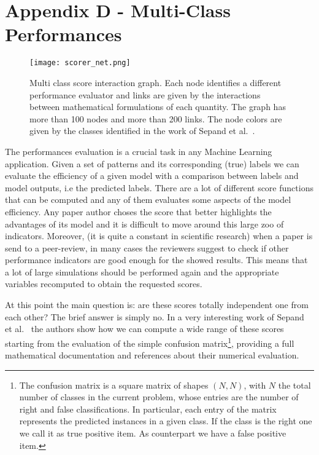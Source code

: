 \documentclass{standalone}
\begin{document}
\chapter*{Appendix D - Multi-Class Performances}

\begin{center}
\begin{figure}[htbp]
\centering
\texttt{[image: scorer\_net.png]}
\caption{Multi class score interaction graph.
Each node identifies a different performance evaluator and links are given by the interactions between mathematical formulations of each quantity.
The graph has more than 100 nodes and more than 200 links.
The node colors are given by the classes identified in the work of Sepand et al.~\cite{PyCM}.
}
\label{fig:scorer_net}
\end{figure}
\end{center}

The performances evaluation is a crucial task in any Machine Learning application.
Given a set of patterns and its corresponding (true) labels we can evaluate the efficiency of a given model with a comparison between labels and model outputs, i.e the predicted labels.
There are a lot of different score functions that can be computed and any of them evaluates some aspects of the model efficiency.
Any paper author choses the score that better highlights the advantages of its model and it is difficult to move around this large zoo of indicators.
Moreover, (it is quite a constant in scientific research) when a paper is send to a peer-review, in many cases the reviewers suggest to check if other performance indicators are good enough for the showed results.
This means that a lot of large simulations should be performed again and the appropriate variables recomputed to obtain the requested scores.

At this point the main question is: are these scores totally independent one from each other?
The brief answer is simply no.
In a very interesting work of Sepand et al.~\cite{PyCM} the authors show how we can compute a wide range of these scores starting from the evaluation of the simple confusion matrix\footnote{
  The confusion matrix is a square matrix of shapes $(N, N)$, with $N$ the total number of classes in the current problem, whose entries are the number of right and false classifications.
  In particular, each entry of the matrix represents the predicted instances in a given class.
  If the class is the right one we call it as true positive item.
  As counterpart we have a false positive item.
}, providing a full mathematical documentation and references about their numerical evaluation.
\end{document}
